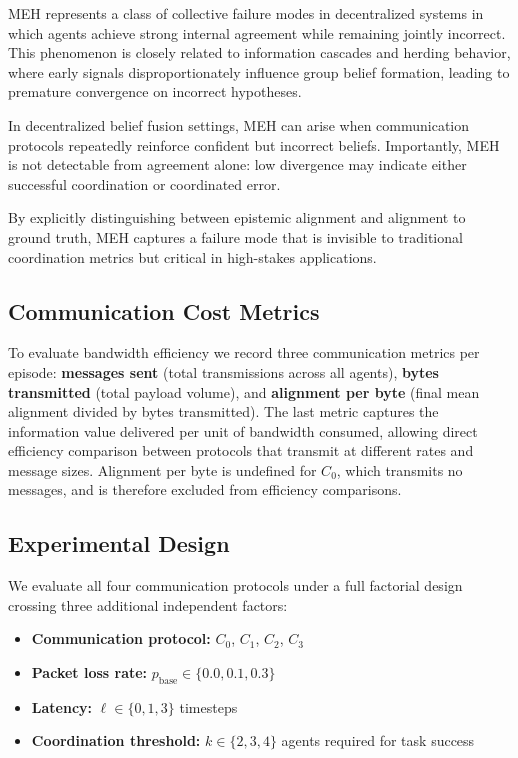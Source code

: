 \documentclass[pdflatex,sn-mathphys-num]{sn-jnl}%
\theoremstyle{thmstyleone}%
\theoremstyle{thmstyletwo}%
\theoremstyle{thmstylethree}%
\begin{document}
MEH represents a class of collective failure modes in decentralized systems in which agents achieve strong internal agreement while remaining jointly incorrect. This phenomenon is closely related to information cascades and herding behavior, where early signals disproportionately influence group belief formation, leading to premature convergence on incorrect hypotheses\cite{bikhchandani1992theory}.

In decentralized belief fusion settings, MEH can arise when communication protocols repeatedly reinforce confident but incorrect beliefs. Importantly, MEH is not detectable from agreement alone: low divergence may indicate either successful coordination or coordinated error.

By explicitly distinguishing between epistemic alignment and alignment to ground truth, MEH captures a failure mode that is invisible to traditional coordination metrics but critical in high-stakes applications.

\subsection{Communication Cost Metrics}

To evaluate bandwidth efficiency we record three communication metrics
per episode: \textbf{messages sent} (total transmissions across all
agents), \textbf{bytes transmitted} (total payload volume), and
\textbf{alignment per byte} (final mean alignment divided by bytes
transmitted). The last metric captures the information value delivered
per unit of bandwidth consumed, allowing direct efficiency comparison
between protocols that transmit at different rates and message sizes.
Alignment per byte is undefined for $C_0$, which transmits no
messages, and is therefore excluded from efficiency comparisons.

\subsection{Experimental Design}
\label{sec:design}

We evaluate all four communication protocols under a full factorial
design crossing three additional independent factors:

\begin{itemize}
    \item \textbf{Communication protocol:} $C_0$, $C_1$, $C_2$, $C_3$
    \item \textbf{Packet loss rate:} $p_{\text{base}} \in \{0.0, 0.1, 0.3\}$
    \item \textbf{Latency:} $\ell \in \{0, 1, 3\}$ timesteps
    \item \textbf{Coordination threshold:} $k \in \{2, 3, 4\}$ agents
          required for task success
\end{itemize}
\end{document}
